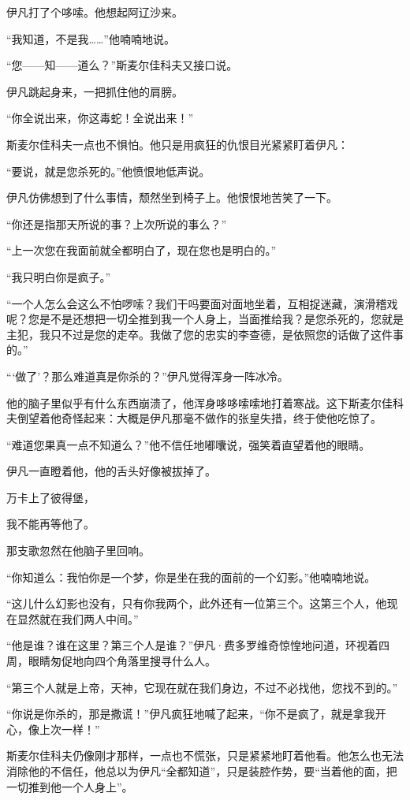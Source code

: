 \par 伊凡打了个哆嗦。他想起阿辽沙来。
\par “我知道，不是我……”他喃喃地说。
\par “您——知——道么？”斯麦尔佳科夫又接口说。
\par 伊凡跳起身来，一把抓住他的肩膀。
\par “你全说出来，你这毒蛇！全说出来！”
\par 斯麦尔佳科夫一点也不惧怕。他只是用疯狂的仇恨目光紧紧盯着伊凡：
\par “要说，就是您杀死的。”他愤恨地低声说。
\par 伊凡仿佛想到了什么事情，颓然坐到椅子上。他恨恨地苦笑了一下。
\par “你还是指那天所说的事？上次所说的事么？”
\par “上一次您在我面前就全都明白了，现在您也是明白的。”
\par “我只明白你是疯子。”
\par “一个人怎么会这么不怕啰嗦？我们干吗要面对面地坐着，互相捉迷藏，演滑稽戏呢？您是不是还想把一切全推到我一个人身上，当面推给我？是您杀死的，您就是主犯，我只不过是您的走卒。我做了您的忠实的李查德，是依照您的话做了这件事的。”
\par “‘做了’？那么难道真是你杀的？”伊凡觉得浑身一阵冰冷。
\par 他的脑子里似乎有什么东西崩溃了，他浑身哆哆嗦嗦地打着寒战。这下斯麦尔佳科夫倒望着他奇怪起来：大概是伊凡那毫不做作的张皇失措，终于使他吃惊了。
\par “难道您果真一点不知道么？”他不信任地嘟囔说，强笑着直望着他的眼睛。
\par 伊凡一直瞪着他，他的舌头好像被拔掉了。
\par 万卡上了彼得堡，
\par 我不能再等他了。
\par 那支歌忽然在他脑子里回响。
\par “你知道么：我怕你是一个梦，你是坐在我的面前的一个幻影。”他喃喃地说。
\par “这儿什么幻影也没有，只有你我两个，此外还有一位第三个。这第三个人，他现在显然就在我们两人中间。”
\par “他是谁？谁在这里？第三个人是谁？”伊凡·费多罗维奇惊惶地问道，环视着四周，眼睛匆促地向四个角落里搜寻什么人。
\par “第三个人就是上帝，天神，它现在就在我们身边，不过不必找他，您找不到的。”
\par “你说是你杀的，那是撒谎！”伊凡疯狂地喊了起来，“你不是疯了，就是拿我开心，像上次一样！”
\par 斯麦尔佳科夫仍像刚才那样，一点也不慌张，只是紧紧地盯着他看。他怎么也无法消除他的不信任，他总以为伊凡“全都知道”，只是装腔作势，要“当着他的面，把一切推到他一个人身上”。
